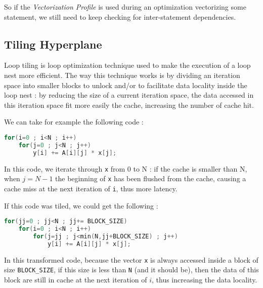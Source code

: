 \documentclass[paper=a4, fontsize=11.5pt]{scrartcl}
\numberwithin{equation}{section}        %
\numberwithin{figure}{section}          %
\numberwithin{table}{section}               %
\begin{document}
    So if the \textit{Vectorization Profile} is used during an optimization vectorizing
    some statement, we still need to keep checking for inter-statement dependencies.


    \subsection{Tiling Hyperplane}
        Loop tiling is loop optimization technique used to make the execution of a loop
        nest more efficient. The way this technique works is by dividing an iteration space
        into smaller blocks to unlock and/or to facilitate data locality inside the loop nest :
        by reducing the size of a current iteration space, the data accessed in this iteration
        space fit more easily the cache, increasing the number of cache hit.

        \medskip
        
        We can take for example the following code :
\begin{lstlisting}[frame=single, language=C, caption={Original Matrix/Vector Multiplication}, label={lst:original_mat_vect_mult}]
for(i=0 ; i<N ; i++)
    for(j=0 ; j<N ; j++)
        y[i] += A[i][j] * x[j];
\end{lstlisting}
        In this code, we iterate through \verb'x' from 0 to N : if the cache is smaller than
        N, when $j=N-1$ the beginning of \verb'x' has been flushed from the cache, causing
        a cache miss at the next iteration of \verb'i', thus more latency.

        \medskip

        If this code was tiled, we could get the following :
\begin{lstlisting}[frame=single, language=C, caption={Tiled Matrix/Vector Multiplication}, label={lst:tiled_mat_vect_mult}]
for(jj=0 ; jj<N ; jj+= BLOCK_SIZE)
    for(i=0 ; i<N ; i++)
        for(j=jj ; j<min(N,jj+BLOCK_SIZE) ; j++)
            y[i] += A[i][j] * x[j];
\end{lstlisting}
        In this transformed code, because the vector \verb'x' is always accessed inside a block
        of size \verb'BLOCK_SIZE', if this size is less than \verb'N' (and it should be),
        then the data of this block are still in cache at the next iteration of $i$, thus
        increasing the data locality.
\end{document}
